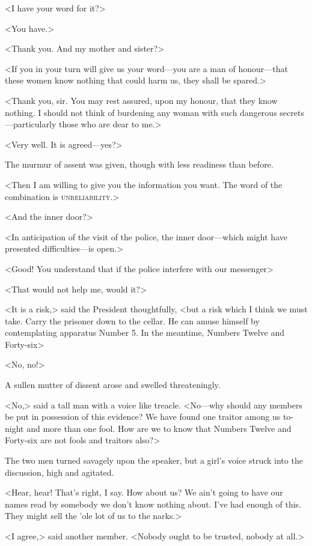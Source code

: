 <I have your word for it?>

<You have.>

<Thank you. And my mother and sister?>

<If you in your turn will give us your word—you are a man of honour—that these women know nothing that could harm us, they shall be spared.>

<Thank you, sir. You may rest assured, upon my honour, that they know nothing. I should not think of burdening any woman with such dangerous secrets—particularly those who are dear to me.>

<Very well. It is agreed—yes?>

The murmur of assent was given, though with less readiness than before.

<Then I am willing to give you the information you want. The word of the combination is \textsc{unreliability}.>

<And the inner door?>

<In anticipation of the visit of the police, the inner door—which might have presented difficulties—is open.>

<Good! You understand that if the police interfere with our messenger\longdash>

<That would not help me, would it?>

<It is a risk,> said the President thoughtfully, <but a risk which I think we must take. Carry the prisoner down to the cellar. He can amuse himself by contemplating apparatus Number 5. In the meantime, Numbers Twelve and Forty-six\longdash>

<No, no!>

A sullen mutter of dissent arose and swelled threateningly.

<No,> said a tall man with a voice like treacle. <No—why should any members be put in possession of this evidence? We have found one traitor among us to-night and more than one fool. How are we to know that Numbers Twelve and Forty-six are not fools and traitors also?>

The two men turned savagely upon the speaker, but a girl's voice struck into the discussion, high and agitated.

<Hear, hear! That's right, I say. How about us? We ain't going to have our names read by somebody we don't know nothing about. I've had enough of this. They might sell the 'ole lot of us to the narks.>

<I agree,> said another member. <Nobody ought to be trusted, nobody at all.>

